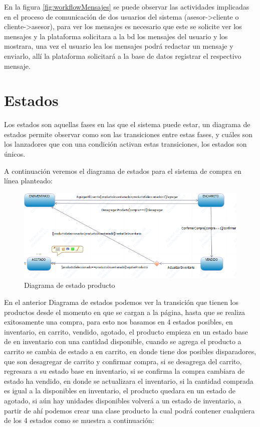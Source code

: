 En la figura \ref{fig:workflowMensajes} se puede observar las actividades implicadas en el proceso de comunicación de dos usuarios del sistema (asesor->cliente o cliente->asesor), para ver los mensajes es necesario que este se solicite ver los mensajes y la plataforma solicitara a la bd los mensajes del usuario y los mostrara, una vez el usuario lea los mensajes podrá redactar un mensaje y enviarlo, allí la plataforma solicitará a la base de datos registrar el respectivo mensaje.

\newpage

\section{Estados}
Los estados son aquellas fases en las que el sistema puede estar, un diagrama de estados permite observar como son las transiciones entre estas fases, y cuáles son los lanzadores que con una condición activan estas transiciones, los estados son únicos. 

A continuación veremos el diagrama de estados para el sistema de compra en línea planteado:

\begin{figure}[th!]
	\centering
	\includegraphics[width=0.9\linewidth]{arquitectura/imagenes/diagramas_estados}
	\caption{Diagrama de estado producto}
\end{figure}

En el anterior Diagrama de estados podemos ver la transición que tienen los productos desde el momento en que se cargan a la página, hasta que se realiza exitosamente una  compra, para esto nos basamos en 4 estados posibles, en inventario, en carrito, vendido, agotado, el producto empieza en un estado base de en inventario con una cantidad disponible, cuando se agrega el producto a carrito se cambia de estado a en carrito, en donde tiene dos posibles disparadores, que son desagregar de carrito y confirmar compra, si se desagrega del carrito, regresara a su estado base en inventario, si se confirma la compra cambiara de estado ha vendido, en donde se actualizara el inventario, si la cantidad comprada es igual a la disponibles en inventario, el producto quedara en un estado de agotado, si aún hay unidades disponibles volverá a un estado de inventario, a partir de ahí podemos crear una clase producto la cual podrá contener cualquiera de los 4 estados como se muestra a continuación:


